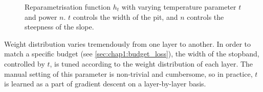 \begin{figure}
    \centering
      \caption{
    Reparametrisation function $h_t$ with varying temperature parameter $t$ and
    power $n$. $t$ controls the width of the pit, and $n$ controls the steepness
    of the slope.}
    \label{fig:stopband}
\end{figure}

Weight distribution varies tremendously from one layer to another. In order to
match a specific budget (see \cref{sec:chap1:budget_loss}), the width of the
stopband, controlled by $t$, is tuned according to the weight distribution of
each layer. The manual setting of this parameter is non-trivial and cumbersome,
so in practice, $t$ is learned as a part of gradient descent on a layer-by-layer
basis.\\

